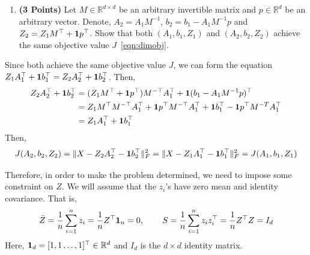 \documentclass[a4paper]{article}
\newcommand*{\one}{{\bf 1}}
\newcommand{\Zbar}{\bar{Z}}
\theoremstyle{definition}
\newcommand{\RR}{\mathbb{R}}
\newenvironment{soln}{
    \leavevmode\color{blue}\ignorespaces
}{}
\begin{document}
\begin{enumerate}
\item \textbf{(3 Points)}
Let $M\in\RR^{d\times d}$ be an arbitrary invertible matrix and $p\in\RR^{d}$ be an arbitrary vector.
Denote, $A_2 = A_1M^{-1}$, $b_2 = b_1- A_1M^{-1}p$ and $Z_2 = Z_1 M^\top +
\one p^\top$.
Show that both
$(A_1, b_1, Z_1)$ and $(A_2, b_2, Z_2)$ achieve the same objective value $J$~\eqref{eqn:dimobj}.
\end{enumerate}

\begin{soln}
    Since both achieve the same objective value $J$, we can form the equation $Z_1 A_1^\top + \one b_1^\top = Z_2 A_2^\top + \one b_2^\top$. Then, \\
    \begin{equation*}
    \begin{split}
    Z_2 A_2^\top + \one b_2^\top &= (Z_1 M^\top + \one p^\top) M^{-\top} A_1^\top + \one (b_1 - A_1 M^{-1} p)^\top \\
    &= Z_1 M^\top M^{-\top} A_1^\top + \one p^\top M^{-\top} A_1^\top + \one b_1^\top - \one p^\top M^{-T} A_1^\top \\
    &= Z_1 A_1^\top + \one b_1^\top
    \end{split}
    \end{equation*}
    Then,
    \begin{equation*}
    J(A_2,b_2,Z_2) = \| X - Z_2 A_2^\top - \one b_2^\top\|_F^2 = \| X - Z_1 A_1^\top - \one b_1^\top\|_F^2 = J(A_1,b_1,Z_1)
    \end{equation*}
\end{soln}


Therefore, in order to make the problem determined, we need to impose some
constraint on $Z$. We will assume that the $z_i$'s have zero mean and identity covariance.
That is,
\begin{align*}
\Zbar = \frac{1}{n} \sum_{i=1}^n z_i =\frac{1}{n} Z^\top {\bf 1}_n = 0, \hspace{0.3in} 
S = \frac{1}{n} \sum_{i=1}^n z_i z_i^\top 
= \frac{1}{n} Z^\top Z
= I_d
\end{align*}
Here, ${\bf 1}_d = [1, 1 \dots, 1]^\top \in\RR^d$ and $I_d$  is the $d\times d$ identity matrix.
\end{document}
